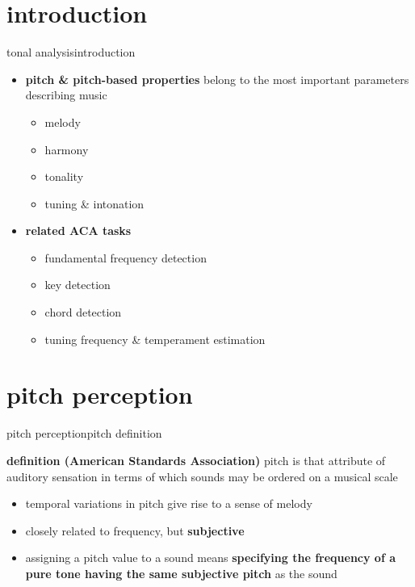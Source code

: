     \section[intro]{introduction}
        \begin{frame}{tonal analysis}{introduction}
            \begin{itemize}
                \item \textbf{pitch \& pitch-based properties} belong to the most important parameters describing music
                    \begin{itemize}
                        \item   melody
                        \item   harmony
                        \item   tonality
                        \item   tuning \& intonation
                    \end{itemize}
                \bigskip
                \item<2-> \textbf{related ACA tasks}
                    \begin{itemize}
                        \item   fundamental frequency detection
                        \item   key detection
                        \item   chord detection
                        \item   tuning frequency \& temperament estimation
                    \end{itemize}
            \end{itemize}
        \end{frame}

    \section[perception]{pitch perception}
         \begin{frame}{pitch perception}{pitch definition}
            \begin{block}{\textbf{definition (American Standards Association)}}
                pitch is that attribute of auditory sensation in terms of which sounds may be ordered on a musical scale
            \end{block}
            \bigskip    
            \begin{itemize}
                \item<2->   temporal variations in pitch give rise to a sense of melody
                \item<2->   closely related to frequency, but \textbf{subjective}

                \bigskip
                \item<3->[$\Rightarrow$]   assigning a pitch value to a sound means \textbf{specifying the frequency of a pure tone having the same subjective pitch} as the sound
            \end{itemize}
        \end{frame}
        
